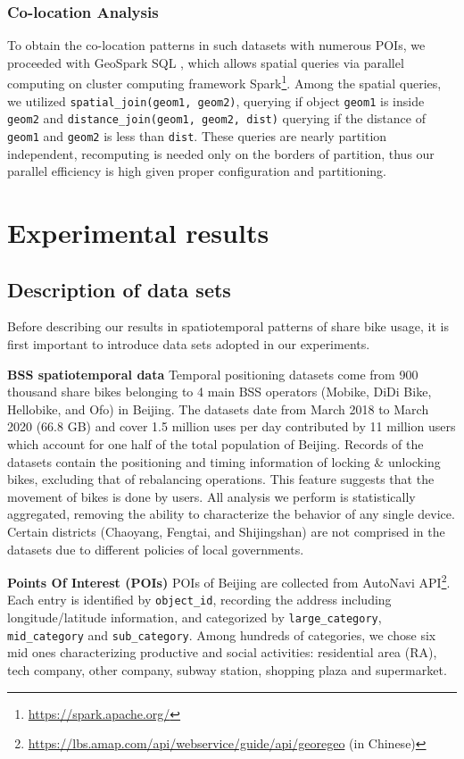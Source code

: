 \documentclass[ijgi,submit,moreauthors,pdftex]{Definitions/mdpi}
\begin{document}
\subsubsection{Co-location Analysis}\label{sec:co-location}
To obtain the co-location patterns in such datasets with numerous POIs, we proceeded with GeoSpark SQL \cite{huang2017geospark}, which allows spatial queries via parallel computing on cluster computing framework Spark\footnote{\url{https://spark.apache.org/}}.
Among the spatial queries, we utilized \texttt{spatial\_join(geom1, geom2)}, querying if object \texttt{geom1} is inside \texttt{geom2} and \texttt{distance\_join(geom1, geom2, dist)} querying if the distance of \texttt{geom1} and \texttt{geom2} is less than \texttt{dist}.
These queries are nearly partition independent, recomputing is needed only on the borders of partition, thus our parallel efficiency is high given proper configuration and partitioning.

\section{Experimental results}\label{sec:experimental results}
\subsection{Description of data sets}
Before describing our results in spatiotemporal patterns of share bike usage, it is first important to introduce data sets adopted in our experiments.

\textbf{BSS spatiotemporal data} Temporal positioning datasets come from 900 thousand share bikes belonging to 4 main BSS operators (Mobike, DiDi Bike, Hellobike, and Ofo) in Beijing.
The datasets date from March 2018 to March 2020 (66.8 GB) and cover 1.5 million uses per day contributed by 11 million users which account for one half of the total population of Beijing.
Records of the datasets contain the positioning and timing information of locking \& unlocking bikes, excluding that of rebalancing operations.
This feature suggests that the movement of bikes is done by users.
All analysis we perform is statistically aggregated, removing the ability to characterize the behavior of any single device.
Certain districts (Chaoyang, Fengtai, and Shijingshan) are not comprised in the datasets due to different policies of local governments.

\textbf{Points Of Interest (POIs)} POIs of Beijing are collected from AutoNavi API\footnote{\url{https://lbs.amap.com/api/webservice/guide/api/georegeo} (in Chinese)}.
Each entry is identified by \texttt{object\_id}, recording the address including longitude/latitude information, and categorized by \texttt{large\_category}, \texttt{mid\_category} and \texttt{sub\_category}.
Among hundreds of categories, we chose six mid ones characterizing productive and social activities: residential area (RA), tech company, other company, subway station, shopping plaza and supermarket.
\end{document}
